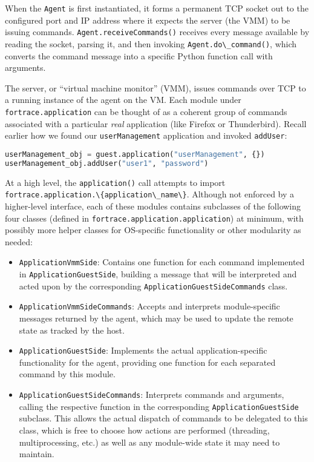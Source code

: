 \documentclass[letterpaper,12pt]{report}
\def\tightlist{}
\newcommand{\passthrough}[1]{#1}
\begin{document}
When the \passthrough{\lstinline!Agent!} is first instantiated, it forms
a permanent TCP socket out to the configured port and IP address where
it expects the server (the VMM) to be issuing commands.
\passthrough{\lstinline!Agent.receiveCommands()!} receives every message
available by reading the socket, parsing it, and then invoking
\passthrough{\lstinline!Agent.do\_command()!}, which converts the
command message into a specific Python function call with arguments.

The server, or ``virtual machine monitor'' (VMM), issues commands over
TCP to a running instance of the agent on the VM. Each module under
\passthrough{\lstinline!fortrace.application!} can be thought of as a
coherent group of commands associated with a particular \emph{real}
application (like Firefox or Thunderbird). Recall earlier how we found
our \passthrough{\lstinline!userManagement!} application and invoked
\passthrough{\lstinline!addUser!}:

\begin{lstlisting}[language=Python]
userManagement_obj = guest.application("userManagement", {})
userManagement_obj.addUser("user1", "password")
\end{lstlisting}

At a high level, the \passthrough{\lstinline!application()!} call
attempts to import
\passthrough{\lstinline!fortrace.application.\{application\_name\}!}.
Although not enforced by a higher-level interface, each of these modules
contains subclasses of the following four classes (defined in
\passthrough{\lstinline!fortrace.application.application!}) at minimum,
with possibly more helper classes for OS-specific functionality or other
modularity as needed:

\begin{itemize}
\tightlist
\item
  \passthrough{\lstinline!ApplicationVmmSide!}: Contains one function
  for each command implemented in
  \passthrough{\lstinline!ApplicationGuestSide!}, building a message
  that will be interpreted and acted upon by the corresponding
  \passthrough{\lstinline!ApplicationGuestSideCommands!} class.
\item
  \passthrough{\lstinline!ApplicationVmmSideCommands!}: Accepts and
  interprets module-specific messages returned by the agent, which may
  be used to update the remote state as tracked by the host.
\item
  \passthrough{\lstinline!ApplicationGuestSide!}: Implements the actual
  application-specific functionality for the agent, providing one
  function for each separated command by this module.
\item
  \passthrough{\lstinline!ApplicationGuestSideCommands!}: Interprets
  commands and arguments, calling the respective function in the
  corresponding \passthrough{\lstinline!ApplicationGuestSide!} subclass.
  This allows the actual dispatch of commands to be delegated to this
  class, which is free to choose how actions are performed (threading,
  multiprocessing, etc.) as well as any module-wide state it may need to
  maintain.
\end{itemize}
\end{document}
